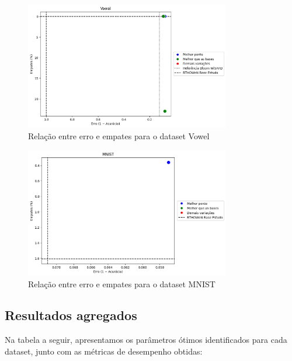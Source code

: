 \documentclass{article}
\begin{document}
\begin{figure}[H]
\centering
\includegraphics[width=0.8\textwidth]{figures/image8.png}
\caption{Relação entre erro e empates para o dataset Vowel}
\label{fig:vowel}
\end{figure}

\begin{figure}[H]
\centering
\includegraphics[width=0.8\textwidth]{figures/image11.png}
\caption{Relação entre erro e empates para o dataset MNIST}
\label{fig:mnist}
\end{figure}


\subsection{Resultados agregados}

Na tabela a seguir, apresentamos os parâmetros ótimos identificados para cada dataset, junto com as métricas de desempenho obtidas:
\end{document}
